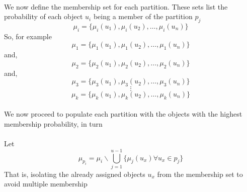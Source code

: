 \documentclass[a4paper]{book}
\begin{document}
		\paragraph{}
			We now define the membership set for each partition. These sets list the probability of each object $u_i$ being a member of the partition $p_j$
			\begin{equation}
				\mu_i = \{ \mu_i(u_1), \mu_i(u_2),\dots,\mu_i(u_n) \}
			\end{equation}
			So, for example
			\begin{equation}
				\mu_1 = \{ \mu_1(u_1), \mu_1(u_2),\dots,\mu_1(u_n) \}
			\end{equation}
			and,
			\begin{equation}
				\mu_2 = \{ \mu_2(u_1), \mu_2(u_2),\dots,\mu_2(u_n) \}
			\end{equation}
			and,
			\begin{equation}
				\mu_3 = \{ \mu_3(u_1), \mu_3(u_2),\dots,\mu_3(u_n) \}
			\end{equation}
			\[
				\vdots
			\]
			\begin{equation}
				\mu_k = \{ \mu_k(u_1), \mu_k(u_2),\dots,\mu_k(u_n) \}
			\end{equation}
		\paragraph{}
			We now proceed to populate each partition with the objects with the highest membership probability, in turn \\ \\
			Let
			\begin{equation}
				\mu_{p_i} = \mu_i \backslash \bigcup_{j=1}^{u-1}{ \{ \mu_j(u_x) \forall u_x \in p_j \} }
			\end{equation}
			That is, isolating the already assigned objects $u_x$ from the membership set to avoid multiple membership
\end{document}
